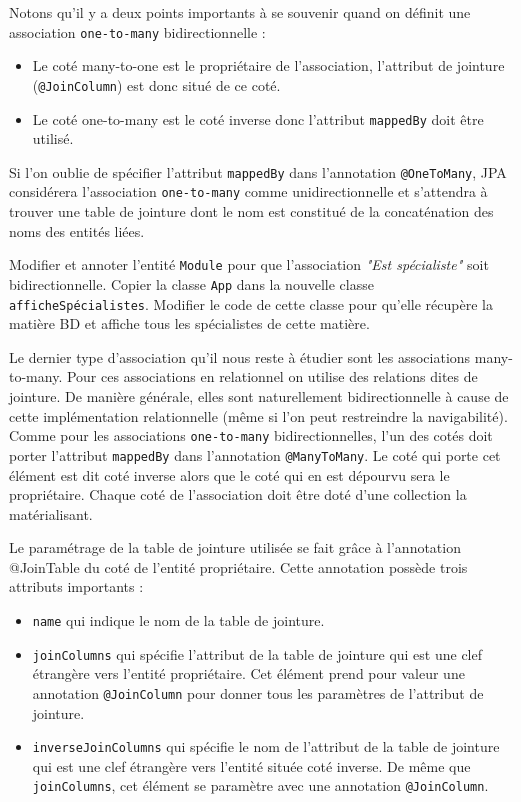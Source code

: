 \documentclass[a4paper,11pt]{article}
\begin{document}
Notons qu'il y a deux points importants à se souvenir quand on définit une association \texttt{one-to-many} 
bidirectionnelle : 
\begin{itemize}
  \item Le coté many-to-one est le propriétaire de l'association, l'attribut de jointure (\texttt{@JoinColumn}) 
  est donc situé de ce coté.
  \item Le coté one-to-many est le coté inverse donc l'attribut \texttt{mappedBy} doit être utilisé. 
\end{itemize}
Si l'on oublie de spécifier l'attribut \texttt{mappedBy} dans l'annotation \texttt{@OneToMany}, JPA considérera 
l'association \texttt{one-to-many} comme unidirectionnelle et s'attendra à trouver une table de jointure dont le nom est 
constitué de la concaténation des noms des entités liées.

\Question Modifier et annoter l'entité \texttt{Module} pour que l'association \textit{"Est spécialiste"} soit bidirectionnelle.
\Question  Copier la classe \texttt{App} dans la nouvelle classe \texttt{afficheSpécialistes}. Modifier le code de cette classe 
pour qu'elle récupère la matière BD et affiche tous les spécialistes de cette matière.

Le dernier type d'association qu'il nous reste à étudier sont les associations many-to-many. Pour ces associations en 
relationnel on utilise des relations dites de jointure. De manière générale, elles sont naturellement bidirectionnelle 
à cause de cette implémentation relationnelle (même si l'on peut restreindre la navigabilité). Comme pour les associations 
\texttt{one-to-many} bidirectionnelles, l'un des cotés doit porter l'attribut \texttt{mappedBy} dans l'annotation 
\texttt{@ManyToMany}. Le coté qui porte cet élément est dit coté inverse alors que le coté qui en est dépourvu sera le 
propriétaire. Chaque coté de l'association doit être doté d'une collection la matérialisant.

Le paramétrage de la table de jointure utilisée se fait grâce à l'annotation @JoinTable du coté de l'entité propriétaire. 
Cette annotation possède trois attributs importants :
\begin{itemize}
  \item \texttt{name} qui indique le nom de la table de jointure.
  \item \texttt{joinColumns} qui spécifie l'attribut de la table de jointure qui est une clef étrangère vers 
  l'entité propriétaire. Cet élément prend pour valeur une annotation \texttt{@JoinColumn} pour donner tous les 
  paramètres de l'attribut de jointure.
  \item \texttt{inverseJoinColumns} qui spécifie le nom de l'attribut de la table de jointure qui est une clef étrangère vers 
  l'entité située coté inverse. De même que \texttt{joinColumns}, cet élément se paramètre avec une annotation \texttt{@JoinColumn}.
\end{itemize}
\end{document}
